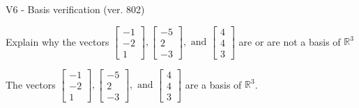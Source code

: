 \begin{exercise}
  \begin{exerciseTitle}V6 - Basis verification (ver. 802)\end{exerciseTitle}
  \begin{exerciseStatement}
    Explain why the vectors \(\left[\begin{array}{r}
-1 \\
-2 \\
1
\end{array}\right] , \left[\begin{array}{r}
-5 \\
2 \\
-3
\end{array}\right] , \text{ and } \left[\begin{array}{r}
4 \\
4 \\
3
\end{array}\right]\) are or are not a basis of \(\mathbb{R}^3\)	


  \end{exerciseStatement}
  \begin{exerciseAnswer}
   The vectors \(\left[\begin{array}{r}
-1 \\
-2 \\
1
\end{array}\right] , \left[\begin{array}{r}
-5 \\
2 \\
-3
\end{array}\right] , \text{ and } \left[\begin{array}{r}
4 \\
4 \\
3
\end{array}\right]\) 
  	 are  a basis of \(\mathbb{R}^3\).
  


  \end{exerciseAnswer}
\end{exercise}